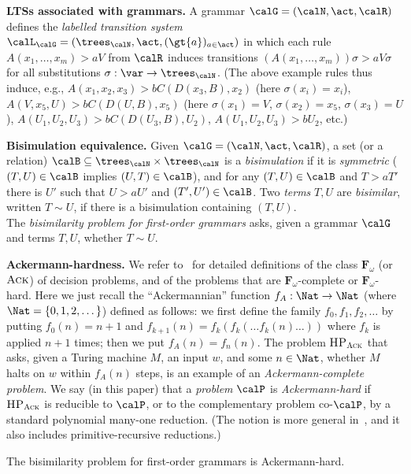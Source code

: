 \documentclass[a4paper,11pt]{article}
\begin{document}
\textbf{LTSs associated with grammars.}
A grammar $\calG=(\calN,\act,\calR)$ defines the \emph{labelled
transition system} $\calL_\calG=(\trees_\calN,\act,(\gt{a})_{a\in\act})$
in which each rule $A(x_1,\dots,x_m)\gt{a}V$ from $\calR$ induces 
transitions 
$(A(x_1,\dots,x_m))\sigma\gt{a}V\sigma$ for all substitutions
$\sigma:\var\rightarrow\trees_\calN$.
(The above example rules thus induce, e.g., 
$A(x_1,x_2,x_3)\gt{b}C(D(x_3,B),x_2)$ (here $\sigma(x_i)=x_i$),
$A(V,x_5,U)\gt{b}C(D(U,B),x_5)$ (here
$\sigma(x_1)=V$, $\sigma(x_2)=x_5$, $\sigma(x_3)=U$),
$A(U_1,U_2,U_3)\gt{b}C(D(U_3,B),U_2)$, $A(U_1,U_2,U_3)\gt{b}U_2$,
etc.)

\textbf{Bisimulation equivalence.}
Given $\calG=(\calN,\act,\calR)$, a set (or a relation)
$\calB\subseteq \trees_\calN\times\trees_\calN$ is a
\emph{bisimulation} if it is \emph{symmetric} ($(T,U)\in\calB$ implies
$(U,T)\in\calB$), and for any $(T,U)\in\calB$ and $T\gt{a}T'$ there is
$U'$ such that  $U\gt{a}U'$ and $(T',U')\in\calB$.
Two \emph{terms} $T,U$ are \emph{bisimilar}, written $T\sim U$, if there is a
bisimulation containing $(T,U)$.
\\
The \emph{bisimilarity problem for first-order grammars} asks, given a grammar $\calG$ and
terms $T,U$, whether $T\sim U$.


\textbf{Ackermann-hardness.}
We refer to~\cite{Schmitz2013} for detailed definitions of the class
 $\mathbf{F}_\omega$ (or $\textsc{Ack}$)
of decision problems, and of the problems that are 
$\mathbf{F}_\omega$-complete
or $\mathbf{F}_\omega$-hard.
Here we just recall the ``Ackermannian'' function
$f_A:\Nat\rightarrow\Nat$ (where $\Nat=\{0,1,2,\dots\}$) defined as
follows: we first define  the family $f_0,f_1,f_2,\dots$ 
by putting $f_0(n)=n{+}1$ and $f_{k+1}(n)=f_k(f_k( \dots f_k(n)\dots))$
where $f_k$ is applied $n{+}1$ times; then we put $f_A(n)=f_n(n)$.
The problem $\textsc{HP}_\textsc{Ack}$ that asks,
given a Turing machine $M$, an input $w$, and some
$n\in\Nat$, whether $M$ halts on $w$ within $f_A(n)$ steps, is an
example of an \emph{Ackermann-complete problem}. 
We say (in this paper) that a \emph{problem}
$\calP$ is
\emph{Ackermann-hard} if $\textsc{HP}_\textsc{Ack}$ is reducible 
to $\calP$, or to the complementary problem co-$\calP$, 
by a standard polynomial
many-one reduction.
(The notion is more general in~\cite{Schmitz2013}, and it also 
includes primitive-recursive reductions.)

\begin{theorem}\label{th:bisackhard}
The bisimilarity problem for
first-order grammars is Ackermann-hard. 
\end{theorem}
\end{document}
